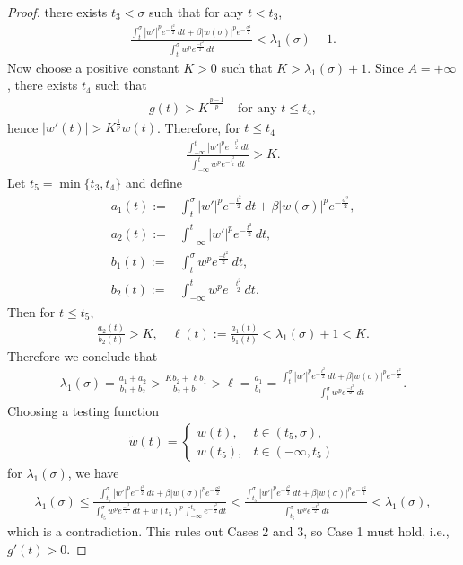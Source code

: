 \documentclass[11pt,leqno]{amsart}
\def\l{\lambda}
\numberwithin{equation}{section}
\begin{document}
\begin{proof}
there exists $t_{3}<\sigma$ such that for any $t<t_{3}$,
\begin{align}
    \frac{ \int_{t}^{\sigma} |w'|^p e^{-\frac{t^2}{2}} \, dt + \beta |w(\sigma)|^p e^{-\frac{\sigma^2}{2}} }{\int_{t}^{\sigma} w^p e^{\frac{-t^2}{2}}\, dt}<\lambda_1(\sigma)+1.
\end{align}
Now choose a positive constant  $K>0$ such that $K>\lambda_1(\sigma)+1$. Since  $A=+\infty$, there exists    $t_{4}$ such that 
\begin{align*}
        g(t)>K^{\frac{p-1}{p}} \quad \text{for any $t\leq t_{4}$},
\end{align*}
 hence
 $|w'(t)|>K^{\frac{1}{p}}w(t)$. Therefore, for $t\le t_4$
\begin{align*}
    \frac{\int_{-\infty}^{t} |w'|^p e^{-\frac{t^2}{2}} \, dt}{\int_{-\infty}^{t} w^p e^{-\frac{t^2}{2}} \,dt} > K.
\end{align*}
Let  $t_5=\min\{t_3,t_4\}$ and define
\begin{align*}
    a_{1}(t):=&\int_{t}^{\sigma} |w'|^p e^{-\frac{t^2}{2}} \, dt + \beta |w(\sigma)|^p e^{-\frac{\sigma^2}{2}},\\
     a_{2}(t):=&\int_{-\infty}^{t} |w'|^p e^{-\frac{t^2}{2}} \, dt,\\
     b_{1}(t):=&\int_{t}^{\sigma} w^p e^{\frac{-t^2}{2}}\, dt,\\
     b_2(t):=&\int_{-\infty}^{t} w^p e^{-\frac{t^2}{2}} \, dt.
\end{align*}
Then for  $t\leq t_5$,
\begin{align*}
   \frac{a_2(t)}{b_2(t)} > K, \quad \ell (t):= \frac{a_1(t)}{b_1(t)}<\lambda_1(\sigma)+1<K. 
\end{align*}
Therefore we conclude that
\begin{align*}
\lambda_1(\sigma)=\frac{a_1 + a_2}{b_1 + b_2} > \frac{K b_2 + \ell b_1}{b_2 + b_1} > \ell = \frac{a_1}{b_1}=\frac{\int_{t}^{\sigma} |w'|^p e^{-\frac{t^2}{2}} \, dt + \beta |w(\sigma)|^p e^{-\frac{\sigma^2}{2}}}{\int_{t}^{\sigma} w^p e^{\frac{-t^2}{2}}\, dt}.
\end{align*}
Choosing a testing function 
\begin{align*}
    \widetilde{w}(t) = 
\begin{cases} 
w(t), & t \in (t_5, \sigma), \\
w(t_5), & t \in (-\infty, t_5)
\end{cases}
\end{align*}
for $\l_1(\sigma)$, we have 
\begin{align*}
    \lambda_1(\sigma)\leq \frac{\int_{t_5}^{\sigma} |w'|^p e^{-\frac{t^2}{2}} \, dt + \beta |w(\sigma)|^p e^{-\frac{\sigma^2}{2}}}{\int_{t_5}^{\sigma} w^p e^{\frac{-t^2}{2}}\, dt+w(t_{5})^p\int_{-\infty}^{t_{5}}e^{-\frac{t^{2}}{2}}dt}< \frac{\int_{t_5}^{\sigma} |w'|^p e^{-\frac{t^2}{2}} \, dt + \beta |w(\sigma)|^p e^{-\frac{\sigma^2}{2}}}{\int_{t_5}^{\sigma} w^p e^{\frac{-t^2}{2}}\, dt}<\lambda_1(\sigma),
\end{align*}
which is a contradiction. This rules out Cases 2 and 3, so Case 1 must hold, i.e.,
 $g'(t)>0$.
\end{proof}
\end{document}
